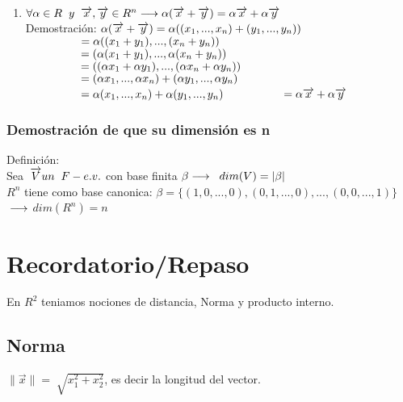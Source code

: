\documentclass{book}
\begin{document}
\begin{enumerate}
    \item 
    $\forall \alpha \in R\hspace*{0.2cm} y \hspace*{0.2cm} \overrightarrow{x},\overrightarrow{y}\in R^n \longrightarrow \alpha(\overrightarrow{x}+\overrightarrow{y})=\alpha \overrightarrow{x}+\alpha\overrightarrow{y}$
    \\Demostración:
    $\\\alpha(\overrightarrow{x}+\overrightarrow{y})=\alpha((x_{1},...,x_{n})+(y_{1},...,y_{n}))$
    $\\\hspace*{1.6cm}=\alpha((x_{1}+y_{1}),...,(x_{n}+y_{n}))$
    $\\\hspace*{1.6cm}=(\alpha(x_{1}+y_{1}),...,\alpha(x_{n}+y_{n}))$
    $\\\hspace*{1.6cm}=((\alpha x_{1}+\alpha y_{1}),...,(\alpha x_{n}+\alpha y_{n}))$
    $\\\hspace*{1.6cm}=(\alpha x_{1},...,\alpha x_{n})+(\alpha y_{1},...,\alpha y_{n})$
    $\\\hspace*{1.6cm}=\alpha(x_{1},...,x_{n})+\alpha(y_{1},...,y_{n})$
    $\\\hspace*{1.6cm}=\alpha\overrightarrow{x}+\alpha\overrightarrow{y}$
\end{enumerate}

\subsubsection{Demostración de que su dimensión es n}
Definición:
\\Sea$\hspace*{0.2cm} \overrightarrow{V} un \hspace*{0.2cm} F-e.v.$ con base finita $\beta\longrightarrow\hspace*{0.2cm}dim(V)=|\beta|$
\\$R^n$ tiene como base canonica: $\beta=\{(1,0,...,0),(0,1,...,0),...,(0,0,...,1)\}$
$\\\longrightarrow$ $dim(R^n)=n$
\newpage
\section{Recordatorio/Repaso}
En $R^2$ teniamos nociones de distancia, Norma y producto interno.
\subsection*{Norma}
$\|\overrightarrow{x}\|=\sqrt[]{x_{1}^2+x_{2}^2}$, es decir la longitud del vector.
\end{document}
